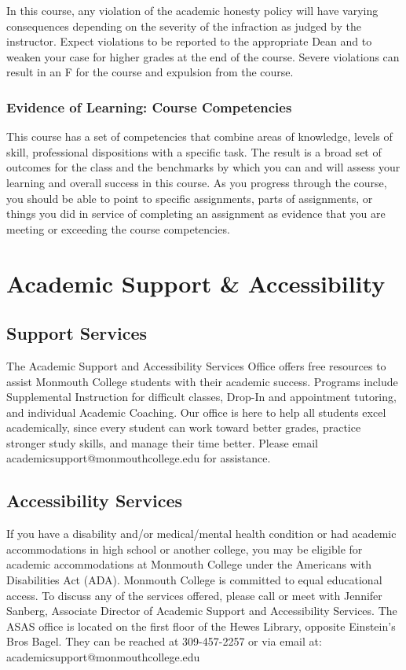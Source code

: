 \documentclass[10pt]{article}
\begin{document}
In this course, any violation of the academic honesty policy will have varying consequences depending on the severity of the infraction as judged by the instructor.  Expect violations to be reported to the appropriate Dean and to weaken your case for higher grades at the end of the course. Severe violations can result in an F for the course and expulsion from the course.

\subsubsection*{Evidence of Learning: Course Competencies}

This course has a set of competencies that combine areas of knowledge, levels of skill, professional dispositions with a specific task. The result is a broad set of outcomes for the class and the benchmarks by which you can and will assess your learning and overall success in this course. As you progress through the course, you should be able to point to specific assignments, parts of assignments, or things you did in service of completing an assignment as evidence that you are meeting or exceeding the course competencies.


\section{Academic Support \& Accessibility}

\subsection*{Support Services}
The Academic Support and Accessibility Services Office offers free resources to assist Monmouth College students with their academic success. Programs include Supplemental Instruction for difficult classes, Drop-In and appointment tutoring, and individual Academic Coaching. Our office is here to help all students excel academically, since every student can work toward better grades, practice stronger study skills, and manage their time better. Please email academicsupport@monmouthcollege.edu for assistance.

\subsection*{Accessibility Services}
If you have a disability and/or medical/mental health condition or had academic accommodations in high school or another college, you may be eligible for academic accommodations at Monmouth College under the Americans with Disabilities Act (ADA). Monmouth College is committed to equal educational access. To discuss any of the services offered, please call or meet with Jennifer Sanberg, Associate Director of Academic Support and Accessibility Services. The ASAS office is located on the first floor of the Hewes Library, opposite Einstein’s Bros Bagel. They can be reached at 309-457-2257 or via email at: academicsupport@monmouthcollege.edu
\end{document}
